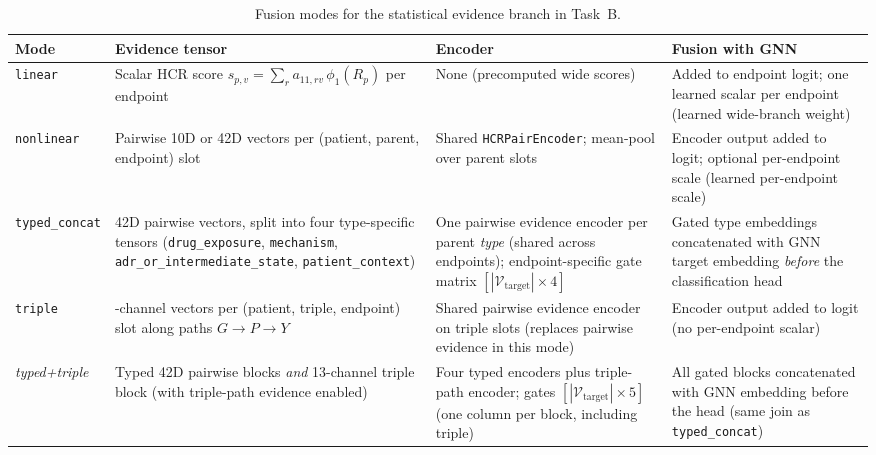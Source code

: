 \begin{table}[H]
  \centering
  \scriptsize
  \setlength{\tabcolsep}{4pt}
  \renewcommand{\arraystretch}{1.15}
  \caption{Fusion modes for the statistical evidence branch in Task~B.}
  \label{tab:fusion_modes}
  \begin{tabular}{@{}>{\raggedright\arraybackslash}p{}
                       >{\raggedright\arraybackslash}p{}
                       >{\raggedright\arraybackslash}p{}
                       >{\raggedright\arraybackslash}p{}@{}}
    \toprule
    \textbf{Mode} & \textbf{Evidence tensor} & \textbf{Encoder} & \textbf{Fusion with GNN} \\
    \midrule
    \texttt{linear}
      & Scalar HCR score
        \(s_{p,v}=\sum_r a_{11,rv}\,\phi_1(R_p)\) per endpoint
      & None (precomputed wide scores)
      & Added to endpoint logit;
        one learned scalar per endpoint
        (learned wide-branch weight) \\
    \texttt{nonlinear}
      & Pairwise 10D or 42D vectors per
        (patient, parent, endpoint) slot
      & Shared \texttt{HCRPairEncoder};
        mean-pool over parent slots
      & Encoder output added to logit;
        optional per-endpoint scale
        (learned per-endpoint scale) \\
    \texttt{typed\_concat}
      & 42D pairwise vectors, split into four
        type-specific tensors (\texttt{drug\_exposure},
        \texttt{mechanism},
        \texttt{adr\_or\_intermediate\_state},
        \texttt{patient\_context})
      & One pairwise evidence encoder per parent
        \emph{type} (shared across endpoints);
        endpoint-specific gate matrix
        $[|\mathcal{V}_{\text{target}}| \times 4]$
      & Gated type embeddings concatenated with
        GNN target embedding \emph{before}
        the classification head \\
    \texttt{triple}
      & 13-channel vectors per
        (patient, triple, endpoint) slot
        along paths \(G \rightarrow P \rightarrow Y\)
      & Shared pairwise evidence encoder on
        triple slots (replaces pairwise
        evidence in this mode)
      & Encoder output added to logit
        (no per-endpoint scalar) \\
    \emph{typed+triple}
      & Typed 42D pairwise blocks \emph{and}
        13-channel triple block
        (with triple-path evidence enabled)
      & Four typed encoders plus
        triple-path encoder; gates
        $[|\mathcal{V}_{\text{target}}| \times 5]$ (one column
        per block, including triple)
      & All gated blocks concatenated with GNN
        embedding before the head
        (same join as \texttt{typed\_concat}) \\
    \bottomrule
  \end{tabular}
\end{table}
\FloatBarrier

